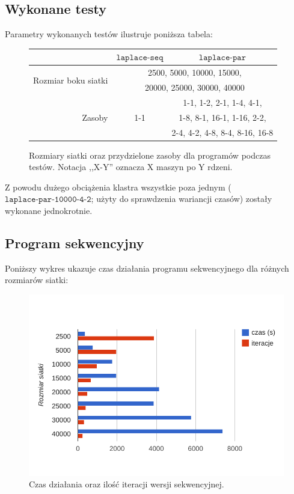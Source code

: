 \documentclass[paper=a4, fontsize=11pt]{scrartcl}	%
\numberwithin{equation}{section}		%
\numberwithin{figure}{section}			%
\numberwithin{table}{section}				%
\begin{document}
\subsection{Wykonane testy}

Parametry wykonanych testów ilustruje poniższa tabela:

\begin{figure}[h]
  \centering
  \begin{tabular}{|r|c|c|}
    \hline
     & $\texttt{laplace-seq}$ & $\texttt{laplace-par}$ \\
    \hline
    \multirow{2}{*}{Rozmiar boku siatki} &
	\multicolumn{2}{|c|}{2500, 5000, 10000, 15000,} \\
     & \multicolumn{2}{|c|}{20000, 25000, 30000, 40000} \\
    \hline
    \multirow{3}{*}{Zasoby} & \multirow{3}{*}{1-1} &
       1-1, 1-2, 2-1, 1-4, 4-1, \\
     &  & 1-8, 8-1, 16-1, 1-16, 2-2,  \\
     &  & 2-4, 4-2, 4-8, 8-4, 8-16, 16-8  \\
    \hline
  \end{tabular}
  \caption{Rozmiary siatki oraz przydzielone zasoby dla programów podczas
           testów. \newline Notacja ,,X-Y'' oznacza X maszyn po Y rdzeni.}
\end{figure}

Z powodu dużego obciążenia klastra wszystkie poza jednym
($\texttt{laplace-par-10000-4-2}$; użyty do sprawdzenia wariancji czasów)
zostały wykonane jednokrotnie.


\subsection{Program sekwencyjny}

Poniższy wykres ukazuje czas działania programu sekwencyjnego dla różnych
rozmiarów siatki:
\begin{figure}[h]
  \centering
    \includegraphics{report/seq-time.pdf}
  \caption{Czas działania oraz ilość iteracji wersji sekwencyjnej.}
\end{figure}
\end{document}
